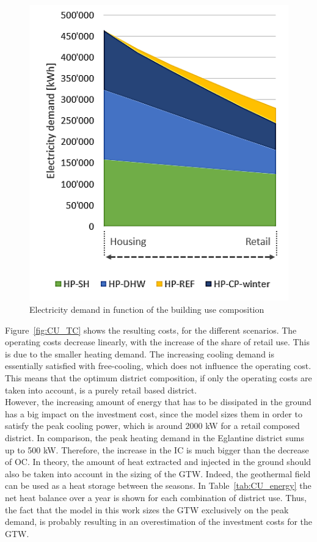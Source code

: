 \documentclass{article}
\begin{document}
\begin{figure}[tph]
	\centering
	\includegraphics[width=0.55\linewidth]{Images/CU_el}
	\caption{Electricity demand in function of the building use composition}
	\label{fig:CU_el}
\end{figure}

Figure~\ref{fig:CU_TC} shows the resulting costs, for the different scenarios. The operating costs decrease linearly, with the increase of the share of retail use. This is due to the smaller heating demand. The increasing cooling demand is essentially satisfied with free-cooling, which does not influence the operating cost. This means that the optimum district composition, if only the operating costs are taken into account, is a purely retail based district.\\

However, the increasing amount of energy that has to be dissipated in the ground has a big impact on the investment cost, since the model sizes them in order to satisfy the peak cooling power, which is around 2000 kW for a retail composed district. In comparison, the peak heating demand in the Eglantine district sums up to 500 kW. Therefore, the increase in the IC is much bigger than the decrease of OC. In theory, the amount of heat extracted and injected in the ground should also be taken into account in the sizing of the GTW. Indeed, the geothermal field can be used as a heat storage between the seasons. In Table~\ref{tab:CU_energy} the net heat balance over a year is shown for each combination of district use. Thus, the fact that the model in this work sizes the GTW exclusively on the peak demand, is probably resulting in an overestimation of the investment costs for the GTW.
\end{document}
